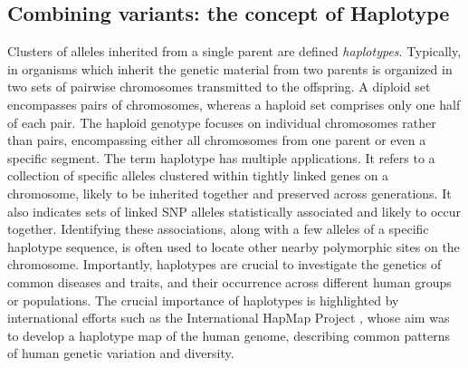 \documentclass[a4paper, titlepage, openright]{book}
\begin{document}
\subsection{Combining variants: the concept of Haplotype}
Clusters of alleles inherited from a single parent are defined \emph{haplotypes}. Typically, in organisms which inherit the genetic material from two parents is organized in two sets of pairwise chromosomes transmitted to the offspring. A diploid set encompasses pairs of chromosomes, whereas a haploid set comprises only one half of each pair. The haploid genotype focuses on individual chromosomes rather than pairs, encompassing either all chromosomes from one parent or even a specific segment. The term haplotype has multiple applications. It refers to a collection of specific alleles clustered within tightly linked genes on a chromosome, likely to be inherited together and preserved across generations. It also indicates sets of linked SNP alleles statistically associated and likely to occur together. Identifying these associations, along with a few alleles of a specific haplotype sequence, is often used to locate other nearby polymorphic sites on the chromosome. Importantly, haplotypes are crucial to investigate the genetics of common diseases and traits, and their occurrence across different human groups or populations. The crucial importance of haplotypes is highlighted by international efforts such as the International HapMap Project \citep{gibbs2003international}, whose aim was to develop a haplotype map of the human genome, describing common patterns of human genetic variation and diversity.

\end{document}
